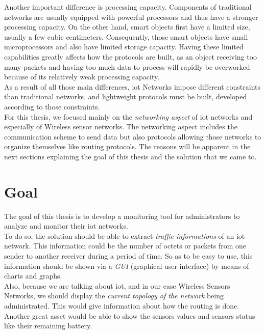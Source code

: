 Another important difference is processing capacity. Components of traditional networks are usually equipped with powerful processors and thus have a stronger processing capacity. On the other hand, smart objects first have a limited size, usually a few cubic centimeters. Consequently, those smart objects have small microprocessors and also have limited storage capacity. Having these limited capabilities greatly affects how the protocols are built, as an object receiving too many packets and having too much data to process will rapidly be overworked because of its relatively weak processing capacity. \\

As a result of all those main differences, \acrshort{iot} Networks impose different constraints than traditional networks, and lightweight protocols must be built, developed according to those constraints.\\

For this thesis, we focused mainly on the \textit{networking aspect} of \acrlong{iot} networks and especially of Wireless sensor networks. The networking aspect includes the communication scheme to send data but also protocols allowing those networks to organize themselves like routing protocols. The reasons will be apparent in the next sections explaining the goal of this thesis and the solution that we came to.

\section*{Goal}

The goal of this thesis is to develop a monitoring tool for administrators to analyze and monitor their \acrshort{iot} networks.\\

To do so, the solution should be able to extract \textit{traffic informations} of an \acrshort{iot} network. This information could be the number of octets or packets from one sender to another receiver during a period of time. So as to be easy to use, this information should be shown via a \textit{GUI} (graphical user interface) by means of charts and graphs. \\

Also, because we are talking about \acrlong{iot}, and in our case Wireless Sensors Networks, we should display the \textit{current topology of the network} being administrated. This would give information about how the routing is done. Another great asset would be able to show the sensors values and sensors status like their remaining battery.\\

